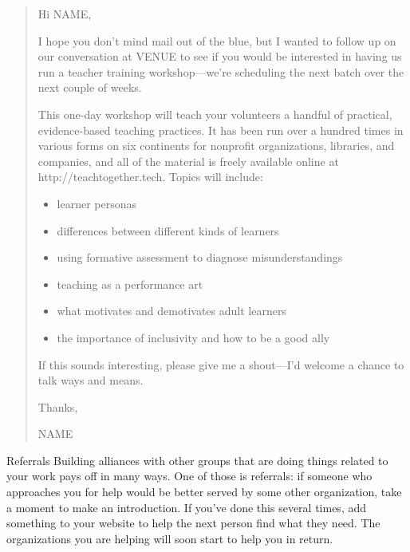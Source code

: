 \begin{quote}

  \noindent
  Hi NAME,

  I hope you don't mind mail out of the blue,
  but I wanted to follow up on our conversation at VENUE
  to see if you would be interested in having us run a teacher training workshop---we're
  scheduling the next batch over the next couple of weeks.

  This one-day workshop will teach your volunteers
  a handful of practical, evidence-based teaching practices.
  It has been run over a hundred times in various forms on six continents
  for nonprofit organizations, libraries, and companies,
  and all of the material is freely available online at http://teachtogether.tech.
  Topics will include:

  \begin{itemize}
  \item learner personas
  \item differences between different kinds of learners
  \item using formative assessment to diagnose misunderstandings
  \item teaching as a performance art
  \item what motivates and demotivates adult learners
  \item the importance of inclusivity and how to be a good ally
  \end{itemize}
  
  If this sounds interesting,
  please give me a shout---I'd welcome a chance to talk ways and means.

  Thanks,

  NAME

\end{quote}

\begin{aside}{Referrals}
  Building alliances with other groups that are doing things related to your work
  pays off in many ways.
  One of those is referrals:
  if someone who approaches you for help would be better served by some other organization,
  take a moment to make an introduction.
  If you've done this several times,
  add something to your website to help the next person find what they need.
  The organizations you are helping will soon start to help you in return.
\end{aside}


